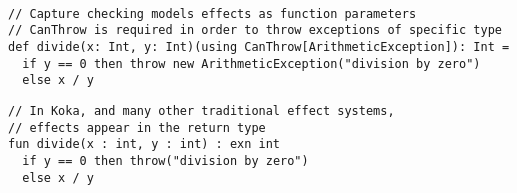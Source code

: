 \begin{algorithm}

\begin{verbatim}

// Capture checking models effects as function parameters
// CanThrow is required in order to throw exceptions of specific type
def divide(x: Int, y: Int)(using CanThrow[ArithmeticException]): Int =
  if y == 0 then throw new ArithmeticException("division by zero")
  else x / y
\end{verbatim}

\begin{verbatim}
// In Koka, and many other traditional effect systems,
// effects appear in the return type
fun divide(x : int, y : int) : exn int 
  if y == 0 then throw("division by zero")
  else x / y
\end{verbatim}

\caption{Capture checking vs Koka effect system %
\label{scala:cc-vs-koka}}
\end{algorithm}
